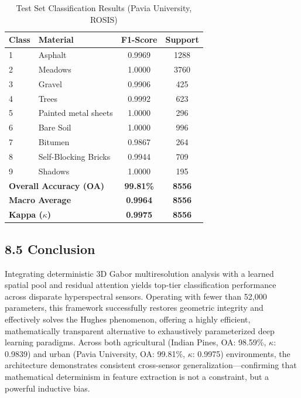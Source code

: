 \documentclass[11pt, letterpaper]{article}
\begin{document}
\begin{table}[H]
\centering
\footnotesize
\caption{Test Set Classification Results (Pavia University, ROSIS)}
\label{tab:hsi_pavia}
\renewcommand{\arraystretch}{1.2}
\sffamily
\begin{tabular}{@{}llcc@{}}
\toprule
\textbf{Class} & \textbf{Material} & \textbf{F1-Score} & \textbf{Support} \\ \midrule
1 & Asphalt & 0.9969 & 1288 \\
2 & Meadows & 1.0000 & 3760 \\
3 & Gravel & 0.9906 & 425 \\
4 & Trees & 0.9992 & 623 \\
5 & Painted metal sheets & 1.0000 & 296 \\
6 & Bare Soil & 1.0000 & 996 \\
7 & Bitumen & 0.9867 & 264 \\
8 & Self-Blocking Bricks & 0.9944 & 709 \\
9 & Shadows & 1.0000 & 195 \\ \midrule
\multicolumn{2}{l}{\textbf{Overall Accuracy (OA)}} & \textbf{99.81\%} & \textbf{8556} \\
\multicolumn{2}{l}{\textbf{Macro Average}} & \textbf{0.9964} & \textbf{8556} \\
\multicolumn{2}{l}{\textbf{Kappa ($\kappa$)}} & \textbf{0.9975} & \textbf{8556} \\ \bottomrule
\end{tabular}
\end{table}

\subsection{8.5 Conclusion}
Integrating deterministic 3D Gabor multiresolution analysis with a learned spatial pool and residual attention yields top-tier classification performance across disparate hyperspectral sensors. Operating with fewer than 52,000 parameters, this framework successfully restores geometric integrity and effectively solves the Hughes phenomenon, offering a highly efficient, mathematically transparent alternative to exhaustively parameterized deep learning paradigms. Across both agricultural (Indian Pines, OA: 98.59\%, $\kappa$: 0.9839) and urban (Pavia University, OA: 99.81\%, $\kappa$: 0.9975) environments, the architecture demonstrates consistent cross-sensor generalization---confirming that mathematical determinism in feature extraction is not a constraint, but a powerful inductive bias.
\end{document}

